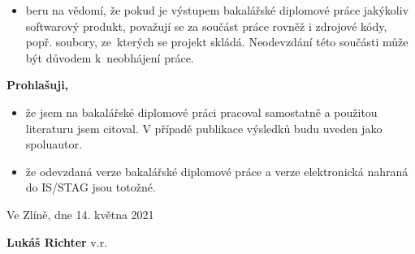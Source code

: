 {{\begin{itemize}
		\item{beru na vědomí, že pokud je výstupem \ifbp bakalářské \else \ifdp diplomové \fi \fi práce jakýkoliv softwarový produkt, považují se za součást práce rovněž i zdrojové kódy, popř. soubory, ze~kterých se projekt skládá. Neodevzdání této součásti může být důvodem k~neobhájení práce.}
	\end{itemize}
	\medskip
	\textbf{Prohlašuji,}
	\begin{itemize}
		\setlength{\parskip}{0pt}
		\setlength{\itemsep}{0pt}
		\item{že jsem na \ifbp bakalářské \else \ifdp diplomové \fi \fi práci pracoval samostatně a použitou literaturu jsem citoval. V případě publikace výsledků budu uveden jako spoluautor.}
		\item{že odevzdaná verze \ifbp bakalářské \else \ifdp diplomové \fi \fi práce a verze elektronická nahraná do IS/STAG jsou totožné.}
	\end{itemize}
	\medskip
	Ve Zlíně, dne 14. května 2021 \hspace{6.5cm}
	
	\hspace{10.3cm}\textbf{Lukáš Richter} v.r.
	
}}
